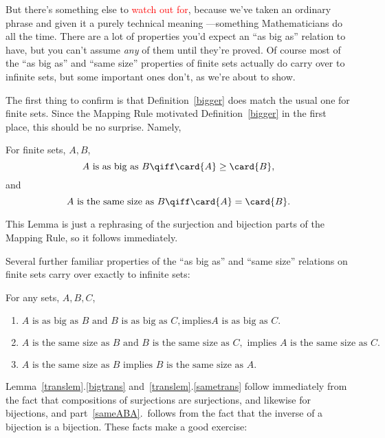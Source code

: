 But there's something else to \textcolor{red}{watch out for}, because
we've taken an ordinary phrase and given it a purely technical meaning
---something Mathematicians do all the time.  There are a lot of
properties you'd expect an ``as big as'' relation to have, but you can't
assume \emph{any} of them until they're proved.  Of course most of the
``as big as'' and ``same size'' properties of finite sets actually do
carry over to infinite sets, but some important ones don't, as we're about
to show.

The first thing to confirm is that Definition~\ref{bigger} does match the
usual one for finite sets.  Since the Mapping Rule motivated
Definition~\ref{bigger} in the first place, this should be no surprise.
Namely,
\begin{lemma}\label{finbig}
For finite sets, $A,B$,
\[
A \text{ is as big as } B \qiff \card{A} \geq \card{B},
\]
and
\[
A \text{ is the same size as } B \qiff \card{A} = \card{B}. 
\]
\end{lemma}
This Lemma is just a rephrasing of the surjection and bijection parts of
the Mapping Rule, so it follows immediately.

Several further familiar properties of the ``as big as'' and ``same size''
relations on finite sets carry over exactly to infinite sets:
\begin{lemma}\label{translem}
 For any sets, $A,B,C$,
\begin{enumerate}

\item \label{bigtrans}
$A \text{ is as big as } B \text{ and }B\text{ is as big as } C, \text{
implies} A \text{ is as big as } C.$


\item \label{sametrans}
$A \text{ is the same size as } B \text{ and }B\text{ is the same size as }
C,\text{ implies } A \text{ is the same size as } C.$

\item\label{sameABA}
$A \text{ is the same size as } B \text{ implies } B\text{ is the same size
  as } A.$
\end{enumerate}
\end{lemma}

Lemma~\ref{translem}.\ref{bigtrans} and~\ref{translem}.\ref{sametrans}
follow immediately from the fact that compositions of surjections are
surjections, and likewise for bijections, and part~\ref{sameABA}.\ follows
from the fact that the inverse of a bijection is a bijection.  These facts
make a good exercise:


